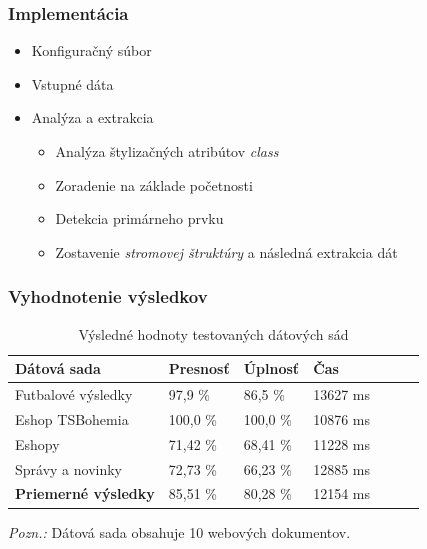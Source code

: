 \documentclass[10pt,xcolor=pdflatex]{beamer}
\begin{document}
\begin{frame}\frametitle{Implementácia}
    \begin{itemize}
        \item Konfiguračný súbor
        \bigskip
        \item Vstupné dáta
        \bigskip
        \item Analýza a extrakcia
        \bigskip
            \begin{itemize}
                \item Analýza štylizačných atribútov \emph{class}
                \bigskip
                \item Zoradenie na základe početnosti
                \bigskip
                \item Detekcia primárneho prvku
                \bigskip
                \item Zostavenie \emph{stromovej štruktúry} a následná extrakcia dát
            \end{itemize}
    \end{itemize}
\end{frame}

\begin{frame}\frametitle{Vyhodnotenie výsledkov}
    \bgroup
    \def\arraystretch{1.5}
    \begin{table}[hbt]
        \caption{Výsledné hodnoty testovaných dátových sád}
        \centering
        \begin{tabular}{|l|l|l|l|l|l|l|}
        \hline
        \textbf{Dátová sada}          & \textbf{Presnosť} & \textbf{Úplnosť}  & \textbf{Čas} \\ \hline
        Futbalové výsledky   & 97,9 \%   & 86,5 \%  & 13627 ms \\ \hline
        Eshop TSBohemia      & 100,0 \%  & 100,0 \% & 10876 ms \\ \hline
        Eshopy               & 71,42 \%  & 68,41 \% & 11228 ms \\ \hline
        Správy a novinky     & 72,73 \%  & 66,23 \% & 12885 ms \\ \hline \hline \hline
        \textbf{Priemerné výsledky}  & 85,51 \%  & 80,28 \% & 12154 ms \\ \hline
        \end{tabular}
    \end{table}
    \egroup
    \emph{Pozn.:} Dátová sada obsahuje 10 webových dokumentov.
\end{frame}
\end{document}
